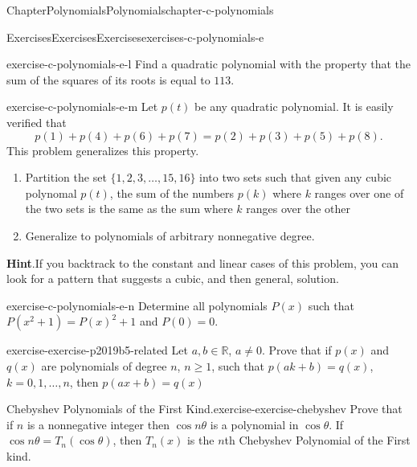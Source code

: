 \documentclass[oneside,10pt,]{book}
\newcommand{\blocktitlefont}{\relax}
\numberwithin{equation}{section}
\newcommand{\RR}{\mathbb{R}}
\begin{document}
\begin{chapterptx}{Chapter}{Polynomials}{}{Polynomials}{}{}{chapter-c-polynomials}
\begin{exercises-section}{Exercises}{Exercises}{}{Exercises}{}{}{exercises-c-polynomials-e}
\begin{divisionexercise}{11}{}{}{exercise-c-polynomials-e-l}
Find a quadratic polynomial with the property that the sum of the squares of its roots is equal to \(113\).%
\end{divisionexercise}%
\begin{divisionexercise}{12}{}{}{exercise-c-polynomials-e-m}%
Let \(p(t)\) be any quadratic polynomial.  It is easily verified that%
\begin{equation*}
p(1)+p(4)+p(6)+p(7) = p(2)+p(3)+p(5)+p(8).
\end{equation*}
This problem generalizes this property.%
\begin{enumerate}[label=(\alph*)]
\item{}Partition the set \(\{1, 2, 3, \dots , 15, 16\}\) into two sets such that given any cubic polynomal \(p(t)\), the sum of the numbers \(p(k)\) where \(k\) ranges over one of  the two sets is the same as the sum where \(k\) ranges over the other%
\item{}Generalize to polynomials of arbitrary nonnegative degree.%
\end{enumerate}
%
\par\smallskip%
\noindent\textbf{\blocktitlefont Hint}.\hypertarget{hint-c-polynomials-e-m-b}{}\quad{}If you backtrack to the constant and linear cases of this problem, you can look for a pattern that suggests a cubic, and then general, solution.%
\end{divisionexercise}%
\begin{divisionexercise}{13}{}{}{exercise-c-polynomials-e-n}%
Determine all polynomials \(P(x)\) such that \(P\left(x^2+1\right)=P(x)^2+1\) and \(P(0)=0\).%
\end{divisionexercise}%
\begin{divisionexercise}{14}{}{}{exercise-exercise-p2019b5-related}%
Let \(a, b \in \RR\), \(a \neq 0\). Prove that if \(p(x)\) and \(q(x)\) are polynomials of degree \(n\), \(n \geq 1\), such that \(p(a k +b)=q(x)\), \(k = 0, 1, \dots, n\), then \(p(a x + b)=q(x)\)%
\end{divisionexercise}%
\begin{divisionexercise}{15}{Chebyshev Polynomials of the First Kind.}{}{exercise-exercise-chebyshev}%
%
Prove that if \(n\) is a nonnegative integer then \(\cos{n \theta}\)  is a polynomial in \(\cos{\theta}\). If \(\cos{n \theta} = T_n(\cos{\theta})\), then \(T_n(x)\) is the \(n\)th Chebyshev Polynomial of the First kind.%
\end{divisionexercise}%
\end{exercises-section}
\end{chapterptx}
\end{document}
